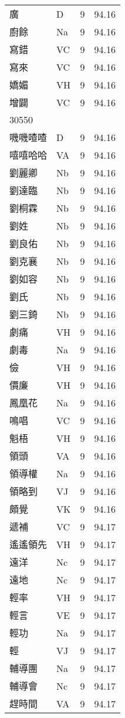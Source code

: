 \documentclass[twocolumn]{book}
\begin{document}
\begin{supertabular}{llrr}
廣 & D & 9 &  94.16\\
廚餘 & Na & 9 &  94.16\\
寫錯 & VC & 9 &  94.16\\
寫來 & VC & 9 &  94.16\\
嬌媚 & VH & 9 &  94.16\\
增闢 & VC & 9 &  94.16\\
30550\\
嘰嘰喳喳 & D & 9 &  94.16\\
嘻嘻哈哈 & VA & 9 &  94.16\\
劉麗卿 & Nb & 9 &  94.16\\
劉達臨 & Nb & 9 &  94.16\\
劉桐霖 & Nb & 9 &  94.16\\
劉姓 & Nb & 9 &  94.16\\
劉良佑 & Nb & 9 &  94.16\\
劉克襄 & Nb & 9 &  94.16\\
劉如容 & Nb & 9 &  94.16\\
劉氏 & Nb & 9 &  94.16\\
劉三錡 & Nb & 9 &  94.16\\
劇痛 & VH & 9 &  94.16\\
劇毒 & Na & 9 &  94.16\\
儉 & VH & 9 &  94.16\\
價廉 & VH & 9 &  94.16\\
鳳凰花 & Na & 9 &  94.16\\
鳴唱 & VC & 9 &  94.16\\
魁梧 & VH & 9 &  94.16\\
領頭 & VA & 9 &  94.16\\
領導權 & Na & 9 &  94.16\\
領略到 & VJ & 9 &  94.16\\
頗覺 & VK & 9 &  94.16\\
遞補 & VC & 9 &  94.17\\
遙遙領先 & VH & 9 &  94.17\\
遠洋 & Nc & 9 &  94.17\\
遠地 & Nc & 9 &  94.17\\
輕率 & VH & 9 &  94.17\\
輕言 & VE & 9 &  94.17\\
輕功 & Na & 9 &  94.17\\
輕 & VJ & 9 &  94.17\\
輔導團 & Na & 9 &  94.17\\
輔導會 & Nc & 9 &  94.17\\
趕時間 & VA & 9 &  94.17\\

\end{supertabular}
\end{document}
